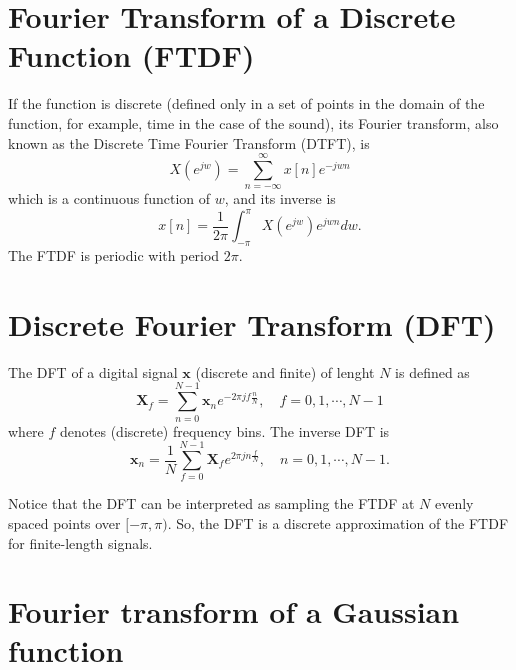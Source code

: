 \documentclass{article}
\begin{document}

\section{Fourier Transform of a Discrete Function (FTDF)}

If the function is discrete (defined only in a set of points in the
domain of the function, for example, time in the case of the sound),
its Fourier transform, also known as the Discrete Time Fourier
Transform (DTFT), is
\begin{equation}
  X(e^{jw}) = \sum_{n=-\infty}^{\infty}x[n]e^{-jwn}
\end{equation}
which is a continuous function of $w$, and its inverse is
\begin{equation}
  x[n] = \frac{1}{2\pi}\int_{-\pi}^{\pi}X(e^{jw})e^{jwn}dw.
\end{equation}
The FTDF is periodic with period $2\pi$.


\section{Discrete Fourier Transform (DFT)}

The DFT of a digital signal $\mathbf{x}$ (discrete and finite) of
lenght $N$ is defined as
\begin{equation}
  \mathbf{X}_f=\sum_{n=0}^{N-1}\mathbf{x}_ne^{-2\pi jf\frac{n}{N}},\quad f=0,1,\cdots,N-1
  \label{eq:DFT}
\end{equation}
where $f$ denotes (discrete) frequency bins. The inverse DFT is
\begin{equation}
  \mathbf{x}_n=\frac{1}{N}\sum_{f=0}^{N-1}\mathbf{X}_fe^{2\pi jn\frac{f}{N}}, \quad  n=0,1,\cdots,N-1.
\end{equation}

Notice that the DFT can be interpreted as sampling the FTDF at $N$
evenly spaced points over $[-\pi, \pi)$. So, the DFT is a discrete
approximation of the FTDF for finite-length signals.


\section{Fourier transform of a Gaussian function}
\label{sec:FTGF}
\end{document}
